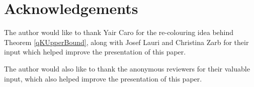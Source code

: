 \documentclass[a4paper,12pt]{article}
\begin{document}
%
%
%
%
%

\section*{Acknowledgements}

The author would like to thank Yair Caro for the re-colouring idea behind Theorem \ref{qKUpperBound}, along with Josef Lauri and Christina Zarb for their input which helped improve the presentation of this paper. 

The author would also like to thank the anonymous reviewers for their valuable input, which also helped improve the presentation of this paper. 



\end{document}
